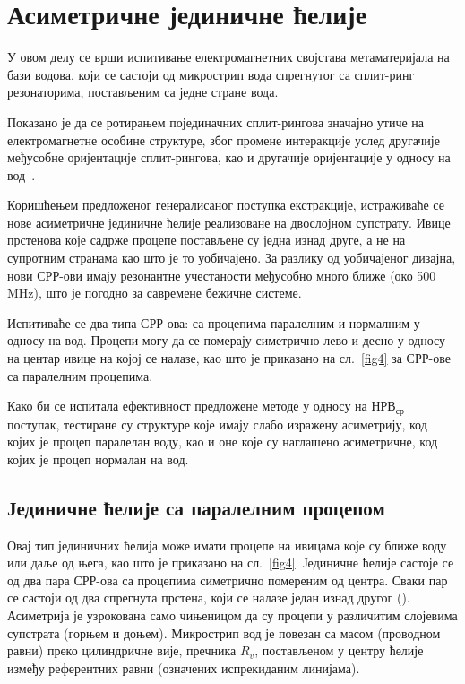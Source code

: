 \documentclass[main.tex]{subfiles}
\begin{document}
\section{Асиметричне јединичне ћелије}\label{sekc3}

У овом делу се врши испитивање електромагнетних својстава метаматеријала на бази водова, који се састоји од микрострип вода спрегнутог са сплит-ринг резонаторима, постављеним са једне стране вода.

Показано је да се ротирањем појединачних сплит-рингова значајно утиче на електромагнетне особине структуре, због промене интеракције услед другачије међусобне оријентације сплит-рингова, као и другачије оријентације у односу на вод~\cite{stereo,bib9}.

Коришћењем предложеног генералисаног поступка екстракције, истраживаће се нове асиметричне јединичне ћелије реализоване на двослојном супстрату. Ивице прстенова које садрже процепе постављене су једна изнад друге, а не на супротним странама као што је то уобичајено. За разлику од уобичајеног дизајна, нови СРР-ови имају резонантне учестаности међусобно много ближе (око 500\,MHz), што је погодно за савремене бежичне системе.

Испитиваће се два типа СРР-ова: са процепима паралелним и нормалним у односу на вод. Процепи могу да се померају симетрично лево и десно у односу на центар ивице на којој се налазе, као што је приказано на сл.~\ref{fig4} за СРР-ове са паралелним процепима.

Како би се испитала ефективност предложене методе у односу на $НРВ_{ср}$ поступак, тестиране су структуре које имају слабо изражену асиметрију, код којих је процеп паралелан воду, као и оне које су наглашено асиметричне, код којих је процеп нормалан на вод.

\subsection{Јединичне ћелије са паралелним процепом}

Овај тип јединичних ћелија може имати процепе на ивицама које су ближе воду или даље од њега, као што је приказано на сл.~\ref{fig4}. Јединичне ћелије састоје се од два пара СРР-ова са процепима симетрично помереним од центра. Сваки пар се састоји од два спрегнута прстена, који се налазе један изнад другог (). Асиметрија је узрокована само чињеницом да су процепи у различитим слојевима супстрата (горњем и доњем). Микрострип вод је повезан са масом (проводном равни) преко цилиндричне вије, пречника $R_v$, постављеном у центру ћелије између референтних равни (означених испрекиданим линијама).
\end{document}
